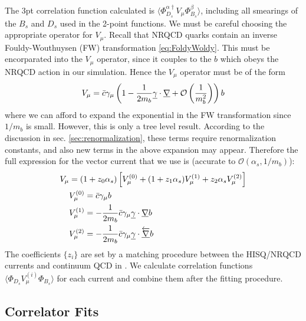 \documentclass[a4paper,10pt]{article}
\numberwithin{equation}{section}
\begin{document}
The 3pt correlation function calculated is $\langle \Phi^{\alpha\dagger}_{D_s} V_{\mu} \Phi^{\beta}_{B_s} \rangle$, including all smearings of the $B_s$ and $D_s$ used in the 2-point functions. We must be careful choosing the appropriate operator for $V_{\mu}$. Recall that NRQCD quarks contain an inverse Fouldy-Wouthuysen (FW) transformation \eqref{eq:FoldyWoldy}. This must be encorparated into the $V_{\mu}$ operator, since it couples to the $b$ which obeys the NRQCD action in our simulation. Hence the $V_{\mu}$ operator must be of the form
\begin{align}
	V_{\mu} = \bar{c}\gamma_{\mu}\left( 1 - {1\over 2m_b} \underline{\gamma}\cdot\underline{\nabla} + \mathcal{O}\left({1\over m_b^2}\right) \right) b 
\end{align}
where we can afford to expand the exponential in the FW transformation since $1/m_b$ is small. However, this is only a tree level result. According to the discussion in sec. \ref{sec:renormalization}, these terms require renormalization constants, and also new terms in the above expansion may appear. Therefore the full expression for the vector current that we use is (accurate to $\mathcal{O}(\alpha_s,1/m_b)$):
\begin{align}
	\nonumber
	V_{\mu} &= (1+z_0 \alpha_s)\left[ V_{\mu}^{(0)} + (1 + z_1 \alpha_s) V_{\mu}^{(1)} + z_2 \alpha_s V_{\mu}^{(2)} \right] \\
	\nonumber
	& V_{\mu}^{(0)} = \bar{c}\gamma_{\mu} b \\
	\nonumber
	& V_{\mu}^{(1)} = -{1\over 2m_b} \bar{c} \gamma_{\mu}\underline{\gamma}\cdot\underline{\nabla} b \\
	\nonumber
	& V_{\mu}^{(2)} = -{1\over 2m_b} \bar{c} \gamma_{\mu}\underline{\gamma}\cdot\underline{\overleftarrow{\nabla}} b \\
	\label{eq:currentcorrections}
\end{align}
The coefficients $\{z_i\}$ are set by a matching procedure between the HISQ/NRQCD currents and continuum QCD in \cite{Monahan:2012dq}. We calculate correlation functions $\langle \Phi_{D_s} V^{(i)}_{\mu} \Phi_{B_s}\rangle$ for each current and combine them after the fitting procedure.

\subsection{Correlator Fits}
\end{document}
